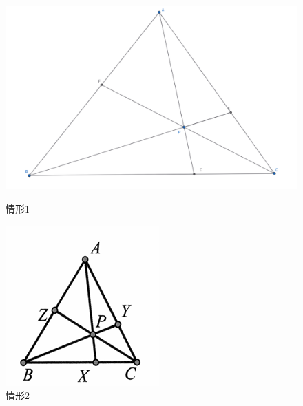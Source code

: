 \begin{figure}[htbp]
    \centering
    \hfill %
    \begin{minipage}[t]{0.3\textwidth}
        \centering
        \includegraphics[width=\linewidth]{figures/ceva (2).png}
        \caption{情形1}
    \end{minipage}
    \hfill %
    \begin{minipage}[t]{0.3\textwidth}
    \centering
    \includegraphics[width=\linewidth]{figures/ceva.png}
    \caption{情形2}

\end{minipage}
\end{figure}
